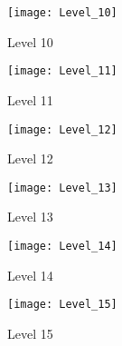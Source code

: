 \begin{figure}
  \centering \texttt{[image: Level\_10]} \caption{Level
    10} \label{fig:level10-pic} \end{figure}
\begin{figure}
  \centering \texttt{[image: Level\_11]} \caption{Level
    11} \label{fig:level11-pic} \end{figure}
\begin{figure}
  \centering \texttt{[image: Level\_12]} \caption{Level
    12} \label{fig:level12-pic} \end{figure}
\begin{figure}
  \centering \texttt{[image: Level\_13]} \caption{Level
    13} \label{fig:level13-pic} \end{figure}
\begin{figure}
  \centering \texttt{[image: Level\_14]} \caption{Level
    14} \label{fig:level14-pic} \end{figure}
\begin{figure}
  \centering \texttt{[image: Level\_15]} \caption{Level
    15} \label{fig:level15-pic} \end{figure}

\clearpage


